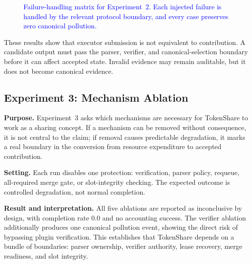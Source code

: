 \documentclass{article}
\theoremstyle{plain}
\begin{document}
\begin{figure}[!htbp]
{{
}
}
\caption{\textcolor{blue}{Failure-handling matrix for Experiment~2. Each injected failure is handled by the relevant protocol boundary, and every case preserves zero canonical pollution.}}
\label{fig:failure-handling-matrix}
\end{figure}

{\color{blue}
These results show that executor submission is not equivalent to contribution. A candidate output must pass the parser, verifier, and canonical-selection boundary before it can affect accepted state. Invalid evidence may remain auditable, but it does not become canonical evidence.
}

\FloatBarrier

\subsection{Experiment 3: Mechanism Ablation}
\label{subsec:exp3-ablation}

{\color{blue}
\textbf{Purpose.} Experiment~3 asks which mechanisms are necessary for TokenShare to work as a sharing concept. If a mechanism can be removed without consequence, it is not central to the claim; if removal causes predictable degradation, it marks a real boundary in the conversion from resource expenditure to accepted contribution.

\textbf{Setting.} Each run disables one protection: verification, parser policy, requeue, all-required merge gate, or slot-integrity checking. The expected outcome is controlled degradation, not normal completion.

\textbf{Result and interpretation.} All five ablations are reported as inconclusive by design, with completion rate 0.0 and no accounting success. The verifier ablation additionally produces one canonical pollution event, showing the direct risk of bypassing plugin verification. This establishes that TokenShare depends on a bundle of boundaries: parser ownership, verifier authority, lease recovery, merge readiness, and slot integrity.
}
\end{document}
